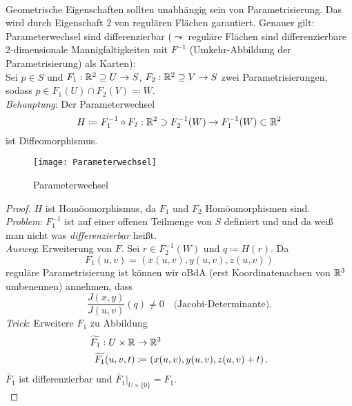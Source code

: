 \begin{remark}
  \  \\
  Geometrische Eigenschaften sollten unabhängig sein von Parametrisierung. Das wird durch Eigenschaft 2 von regulären Flächen garantiert. Genauer gilt: Parameterwechsel sind differenzierbar (\( \leadsto \) reguläre Flächen sind differenzierbare \( 2 \)-dimensionale Mannigfaltigkeiten mit \( F^{-1} \) (Umkehr-Abbildung der Parametrisierung) als Karten): \\
  Sei \( p \in S \) und \( F_1 : \mathbb{R}^2 \supseteq U \to S \), \( F_2: \mathbb{R}^2 \supseteq V \to S \) zwei Parametrisierungen, sodass \( p \in F_1(U) \cap F_2(V) \eqqcolon W \). \\
  \emph{Behauptung}: Der Parameterwechsel 
  \begin{equation*}
    H \coloneqq F_1^{-1} \circ F_2 : \mathbb{R}^2 \supset F_2^{-1}(W) \to F_1^{-1}(W) \subset \mathbb{R}^2
  \end{equation*}
  ist Diffeomorphismus.
  \begin{figure}[H]
    \texttt{[image: Parameterwechsel]}
    \caption{Parameterwechsel}
  \end{figure}
  \begin{proof}
    \( H \) ist Homöomorphismus, da \( F_1 \) und \( F_2 \) Homöomorphismen sind. \\
    \emph{Problem}: \( F_1^{-1} \) ist auf einer offenen Teilmenge von \( S \) definiert und und da weiß man nicht was \emph{differenzierbar} heißt. \\
    \emph{Ausweg}: Erweiterung von \( F \). Sei \( r \in F_2^{-1}(W) \) und \( q \coloneqq H(r) \). Da
      \begin{equation*}
        F_1(u,v) = \left( x(u,v),y(u,v),z(u,v) \right)
      \end{equation*}
    reguläre Parametrisierung ist können wir oBdA (erst Koordinatenachsen von \( \mathbb{R}^3 \) umbenennen) annehmen, dass
    \begin{equation*}
      \frac{J(x,y)}{J(u,v)}(q) \neq 0 \quad \text{(Jacobi-Determinante).}
    \end{equation*}
    \emph{Trick}: Erweitere \( F_1 \) zu Abbildung
    \begin{align*}
      \widetilde{F_1} : U \times \mathbb{R} &\to \mathbb{R}^3 \\
        \widetilde{F_1}(u,v,t) &\coloneqq \left( x(u,v),y(u,v),z(u,v)+t \right)\text{.}
    \end{align*}
    \( \widetilde{F_1} \) ist differenzierbar und \( \widetilde{F_1}|_{U \times \{ 0 \}} = F_1 \). \\

\end{proof}
\end{remark}
